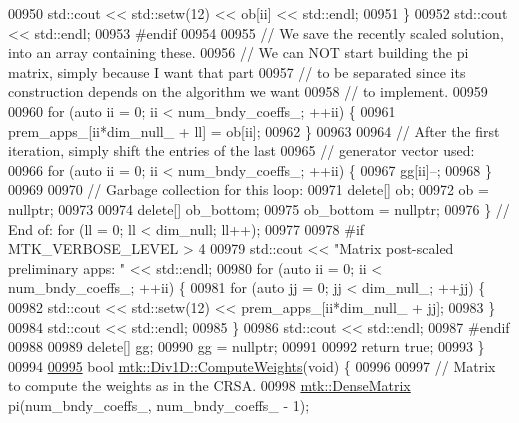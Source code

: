 \begin{DoxyCode}
{{00950       std::cout << std::setw(12) << ob[ii] << std::endl;
00951     \}
00952     std::cout << std::endl;
00953 \textcolor{preprocessor}{    #endif}
00954 
00955     \textcolor{comment}{// We save the recently scaled solution, into an array containing these.}
00956     \textcolor{comment}{// We can NOT start building the pi matrix, simply because I want that part}
00957     \textcolor{comment}{// to be separated since its construction depends on the algorithm we want}
00958     \textcolor{comment}{// to implement.}
00959 
00960     \textcolor{keywordflow}{for} (\textcolor{keyword}{auto} ii = 0; ii < num\_bndy\_coeffs\_; ++ii) \{
00961       prem\_apps\_[ii*dim\_null\_ + ll] = ob[ii];
00962     \}
00963 
00964     \textcolor{comment}{// After the first iteration, simply shift the entries of the last}
00965     \textcolor{comment}{// generator vector used:}
00966     \textcolor{keywordflow}{for} (\textcolor{keyword}{auto} ii = 0; ii < num\_bndy\_coeffs\_; ++ii) \{
00967       gg[ii]--;
00968     \}
00969 
00970     \textcolor{comment}{// Garbage collection for this loop:}
00971     \textcolor{keyword}{delete}[] ob;
00972     ob = \textcolor{keyword}{nullptr};
00973 
00974     \textcolor{keyword}{delete}[] ob\_bottom;
00975     ob\_bottom = \textcolor{keyword}{nullptr};
00976   \} \textcolor{comment}{// End of: for (ll = 0; ll < dim\_null; ll++);}
00977 
00978 \textcolor{preprocessor}{  #if MTK\_VERBOSE\_LEVEL > 4}
00979   std::cout << \textcolor{stringliteral}{"Matrix post-scaled preliminary apps: "} << std::endl;
00980   \textcolor{keywordflow}{for} (\textcolor{keyword}{auto} ii = 0; ii < num\_bndy\_coeffs\_; ++ii) \{
00981     \textcolor{keywordflow}{for} (\textcolor{keyword}{auto} jj = 0; jj < dim\_null\_; ++jj) \{
00982       std::cout << std::setw(12) << prem\_apps\_[ii*dim\_null\_ + jj];
00983     \}
00984     std::cout << std::endl;
00985   \}
00986   std::cout << std::endl;
00987 \textcolor{preprocessor}{  #endif}
00988 
00989   \textcolor{keyword}{delete}[] gg;
00990   gg = \textcolor{keyword}{nullptr};
00991 
00992   \textcolor{keywordflow}{return} \textcolor{keyword}{true};
00993 \}
00994 
\hypertarget{mtk__div__1d_8cc_source_l00995}{}\hyperlink{classmtk_1_1Div1D_aaadd6a6e6836bb94841c4c35dffab828}{00995} \textcolor{keywordtype}{bool} \hyperlink{classmtk_1_1Div1D_aaadd6a6e6836bb94841c4c35dffab828}{mtk::Div1D::ComputeWeights}(\textcolor{keywordtype}{void}) \{
00996 
00997   \textcolor{comment}{// Matrix to compute the weights as in the CRSA.}
00998   \hyperlink{classmtk_1_1DenseMatrix}{mtk::DenseMatrix} pi(num\_bndy\_coeffs\_, num\_bndy\_coeffs\_ - 1);
}}
\end{DoxyCode}
